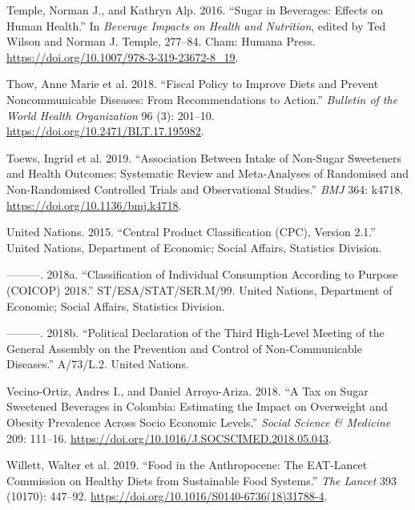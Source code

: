 \documentclass[
  11pt,
]{article}
\newlength{\cslhangindent}
\newenvironment{CSLReferences}[2] %
 {\begin{list}{}{%
  \setlength{\itemindent}{0pt}
  \setlength{\leftmargin}{0pt}
  \setlength{\parsep}{0pt}
  \ifodd #1
   \setlength{\leftmargin}{\cslhangindent}
   \setlength{\itemindent}{-1\cslhangindent}
  \fi
  \setlength{\itemsep}{#2\baselineskip}}}
 {\end{list}}
\begin{document}
\begin{CSLReferences}{1}{0}
Temple, Norman J., and Kathryn Alp. 2016. {``Sugar in Beverages: Effects
on Human Health.''} In \emph{Beverage Impacts on Health and Nutrition},
edited by Ted Wilson and Norman J. Temple, 277--84. Cham: Humana Press.
\url{https://doi.org/10.1007/978-3-319-23672-8_19}.

Thow, Anne Marie et al. 2018. {``Fiscal Policy to Improve Diets and
Prevent Noncommunicable Diseases: From Recommendations to Action.''}
\emph{Bulletin of the World Health Organization} 96 (3): 201--10.
\url{https://doi.org/10.2471/BLT.17.195982}.

Toews, Ingrid et al. 2019. {``Association Between Intake of Non-Sugar
Sweeteners and Health Outcomes: Systematic Review and Meta-Analyses of
Randomised and Non-Randomised Controlled Trials and Observational
Studies.''} \emph{BMJ} 364: k4718.
\url{https://doi.org/10.1136/bmj.k4718}.

United Nations. 2015. {``Central Product Classification ({CPC}), Version
2.1.''} United Nations, Department of Economic; Social Affairs,
Statistics Division.

---------. 2018a. {``Classification of Individual Consumption According
to Purpose ({COICOP}) 2018.''} ST/ESA/STAT/SER.M/99. United Nations,
Department of Economic; Social Affairs, Statistics Division.

---------. 2018b. {``Political Declaration of the Third High-Level
Meeting of the {General Assembly} on the Prevention and Control of
Non-Communicable Diseases.''} A/73/L.2. United Nations.

Vecino-Ortiz, Andres I., and Daniel Arroyo-Ariza. 2018. {``A Tax on
Sugar Sweetened Beverages in {Colombia}: Estimating the Impact on
Overweight and Obesity Prevalence Across Socio Economic Levels.''}
\emph{Social Science \& Medicine} 209: 111--16.
\url{https://doi.org/10.1016/J.SOCSCIMED.2018.05.043}.

Willett, Walter et al. 2019. {``Food in the {Anthropocene}: The
{EAT-Lancet Commission} on Healthy Diets from Sustainable Food
Systems.''} \emph{The Lancet} 393 (10170): 447--92.
\url{https://doi.org/10.1016/S0140-6736(18)31788-4}.


\end{CSLReferences}
\end{document}
